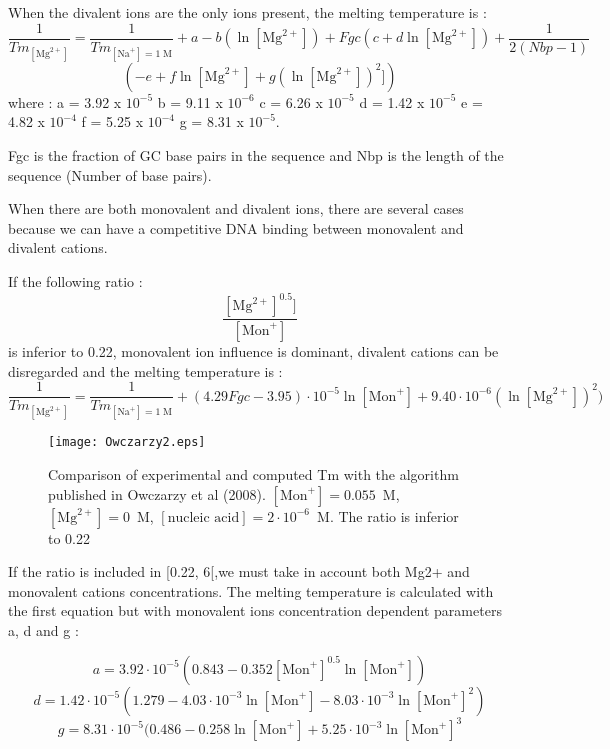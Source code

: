 \documentclass{article}
\begin{document}
When the divalent ions are the only ions present, the melting temperature is :
\begin{displaymath}
\frac{1}{Tm_{[\mbox{Mg}^{2+}]}} = \frac{1}{Tm_{[\mbox{Na}^+]=1\;\mathrm{M}}} + a
- b (\ln [\mbox{Mg}^{2+}]) + Fgc (c + d \ln [\mbox{Mg}^{2+}]) + \frac{1}{2 (Nbp-1)} 
\end{displaymath}
\begin{displaymath}
(-e + f \ln [\mbox{Mg}^{2+}] + g (\ln [\mbox{Mg}^{2+}])^{2}])
\end{displaymath}
   where : 
a = 3.92 x $10^{-5}$
b = 9.11 x $10^{-6}$
c = 6.26 x $10^{-5}$
d = 1.42 x $10^{-5}$
e = 4.82 x $10^{-4}$
f = 5.25 x $10^{-4}$
g = 8.31 x $10^{-5}$.

Fgc is the fraction of GC base pairs in the sequence and 
Nbp is the length of the sequence (Number of base pairs).

When there are both monovalent and divalent ions, there are several cases because we can have
a competitive DNA binding between monovalent and divalent 
cations.

If the following ratio :
\begin{displaymath}
  \frac{[\mbox{Mg}^{2+}]^{0.5}]}{[\mbox{Mon}^+]}  
\end{displaymath}
is inferior to 0.22, monovalent ion influence is dominant, divalent cations can be 
disregarded and the melting temperature is :
\begin{displaymath}
\frac{1}{Tm_{[\mbox{Mg}^{2+}]}} = \frac{1}{Tm_{[\mbox{Na}^+]=1\;\mathrm{M}}} + (4.29
Fgc - 3.95)\cdot{}10^{-5} \ln [\mbox{Mon}^+] + 9.40\cdot{}10^{-6} (\ln [\mbox{Mg}^{2+}])^{2})
\end{displaymath}
  
\begin{figure}[H]
\texttt{[image: Owczarzy2.eps]}
\caption{Comparison of experimental and computed Tm with the algorithm published
in Owczarzy et al (2008). $[\mbox{Mon}^+] = 0.055$~M, $[\mbox{Mg}^{2+}] = 0$~M, $[\mbox{nucleic acid}] =
2\cdot{}10^{-6}$~M. The ratio is inferior to 0.22}
\end{figure}


If the ratio is included in [0.22, 6[,we must take in account both Mg2+ and monovalent cations 
concentrations. The melting temperature is calculated with the first equation but with monovalent 
ions concentration dependent parameters a, d and g :

\begin{displaymath}
a = 3.92\cdot{}10^{-5} (0.843 - 0.352 [\mbox{Mon}^+]^{0.5} \ln [\mbox{Mon}^+]) 
\end{displaymath}
\begin{displaymath}
d = 1.42\cdot{}10^{-5} (1.279 - 4.03\cdot{}10^{-3} \ln [\mbox{Mon}^+] -
8.03\cdot{}10^{-3} \ln [\mbox{Mon}^+]^{2})
\end{displaymath}
\begin{displaymath}
g = 8.31\cdot{}10^{-5} (0.486 - 0.258 \ln [\mbox{Mon}^+] + 5.25\cdot{}10^{-3}
\ln [\mbox{Mon}^+]^{3} 
\end{displaymath}
\end{document}
